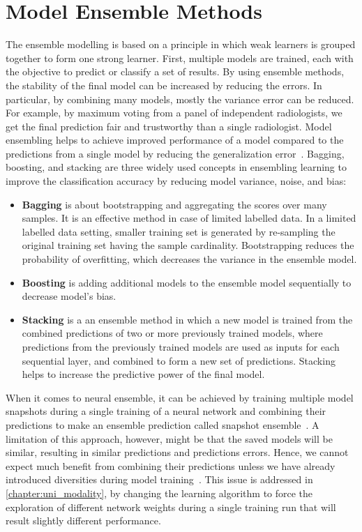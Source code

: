 \section{Model Ensemble Methods}
The ensemble modelling is based on a principle in which weak learners is grouped together to form one strong learner. First, multiple models are trained, each with the objective to predict or classify a set of results. By using ensemble methods, the stability of the final model can be increased by reducing the errors. In particular, by combining many models, mostly the variance error can be reduced. For example, by maximum voting from a panel of independent radiologists, we get the final prediction fair and trustworthy than a single radiologist. 
Model ensembling helps to achieve improved performance of a model compared to the predictions from a single model by reducing the generalization error~\cite{karimACCA2019}. Bagging, boosting, and stacking are three widely used concepts in ensembling learning to improve the classification accuracy by reducing model variance, noise, and bias: 

\begin{itemize}[noitemsep]
    \item \textbf{Bagging} is about bootstrapping and aggregating the scores over many samples. It is an effective method in case of limited labelled data. In a limited labelled data setting, smaller training set is generated by re-sampling the original training set having the sample cardinality. Bootstrapping reduces the probability of overfitting, which decreases the variance in the ensemble model. 
    \item \textbf{Boosting} is adding additional models to the ensemble model sequentially to decrease model’s bias.
    \item \textbf{Stacking} is a an ensemble method in which a new model is trained from the combined predictions of two or more previously trained models, where predictions from the previously trained models are used as inputs for each sequential layer, and combined to form a new set of predictions. Stacking helps to increase the predictive power of the final model. 
\end{itemize}

\hspace*{3.5mm} When it comes to neural ensemble, it can be achieved by training multiple model snapshots during a single training of a neural network and combining their predictions to make an ensemble prediction called snapshot ensemble~\cite{huang2017snapshot}. A limitation of this approach, however, might be that the saved models will be similar, resulting in similar predictions and predictions errors. Hence, we cannot expect much benefit from combining their predictions unless we have already introduced diversities during model training~\cite{huang2017snapshot}. This issue is addressed in \cref{chapter:uni_modality}, by changing the learning algorithm to force the exploration of different network weights during a single training run that will result slightly different performance\cite{karimACCA2019}. 

